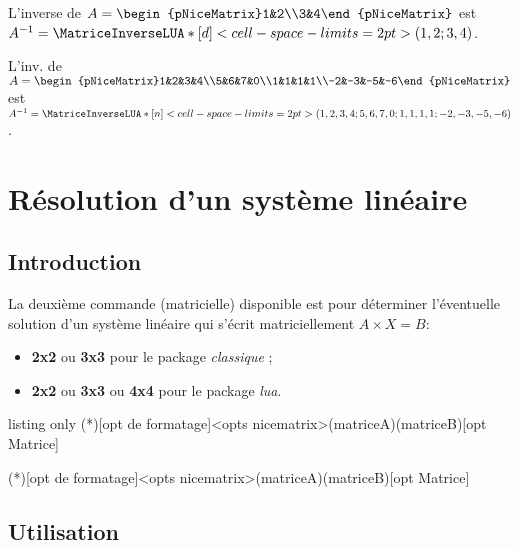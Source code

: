 \documentclass[a4paper,11pt]{article}
\begin{document}
\begin{PresentationCode}{}
L'inverse de $A=\begin{pNiceMatrix}1&2\\3&4\end{pNiceMatrix}$ est
$A^{-1}=\MatriceInverseLUA*[d]<cell-space-limits=2pt>(1,2;3,4)$.
\end{PresentationCode}

\begin{PresentationCode}{}
L'inv. de $A=\begin{pNiceMatrix}1&2&3&4\\5&6&7&0\\1&1&1&1\\-2&-3&-5&-6\end{pNiceMatrix}$ est
$A^{-1}=\MatriceInverseLUA*[n]<cell-space-limits=2pt>(1,2,3,4;5,6,7,0;1,1,1,1;-2,-3,-5,-6)$.
\end{PresentationCode}

\section{Résolution d'un système linéaire}

\subsection{Introduction}

La deuxième commande (matricielle) disponible est pour déterminer l'éventuelle solution d'un système linéaire  qui s'écrit matriciellement $A\times X=B$:

\begin{itemize}
	\item \textbf{2x2} ou \textbf{3x3} pour le package \textit{classique} ;
	\item \textbf{2x2} ou \textbf{3x3} ou \textbf{4x4} pour le package \textit{lua}.
\end{itemize}

\begin{PresentationCode}{listing only}
\SolutionSysteme(*)[opt de formatage]<opts nicematrix>(matriceA)(matriceB)[opt Matrice]

\SolutionSystemeLUA(*)[opt de formatage]<opts nicematrix>(matriceA)(matriceB)[opt Matrice]
\end{PresentationCode}

\subsection{Utilisation}
\end{document}
